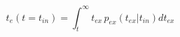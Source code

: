 \begin{equation}
t_e(t=t_{in}) =\int_t^{\infty} t_{ex}\, p_{ex}(t_{ex}|t_{in}) dt_{ex}
\end{equation}